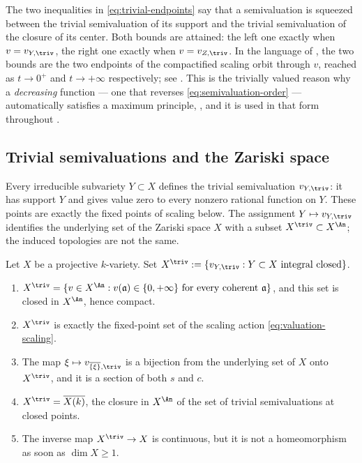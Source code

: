 \begin{remark}
\label{rem:ch32-endpoints-reading}
The two inequalities in \eqref{eq:trivial-endpoints} say that a
semivaluation is squeezed between the trivial semivaluation of its support
and the trivial semivaluation of the closure of its center.  Both bounds are
attained: the left one exactly when $v=v_{Y,\triv}$, the right one exactly
when $v=v_{Z,\triv}$.  In the language of
, the two bounds are the two endpoints of the
compactified scaling orbit through $v$, reached as $t\to0^+$ and
$t\to+\infty$ respectively; see .  This is
the trivially valued reason why a \emph{decreasing} function --- one that
reverses \eqref{eq:semivaluation-order} --- automatically satisfies a
maximum principle, , and it is used in that
form throughout .
\end{remark}

\subsection{Trivial semivaluations and the Zariski space}
\label{sec:ch32-trivial-locus}

Every irreducible subvariety $Y\subset X$ defines the trivial
semivaluation $v_{Y,\triv}$: it has support $Y$ and gives value zero to
every nonzero rational function on $Y$.  These points are exactly the fixed
points of scaling below.  The assignment $Y\mapsto v_{Y,\triv}$ identifies
the underlying set of the Zariski space $X$ with a subset
$X^{\triv}\subset X^{\An}$; the induced topologies are not the same.

\begin{theorem}
\label{thm:ch32-trivial-locus}
Let $X$ be a projective $k$-variety.  Set
$X^{\triv}:=\{v_{Y,\triv}:Y\subset X\text{ integral closed}\}$.
\begin{enumerate}
\item\label{itm:ch32-tl:char}
$X^{\triv}=\{v\in X^{\An}:v(\mathfrak a)\in\{0,+\infty\}\text{ for every
coherent }\mathfrak a\}$, and this set is closed in $X^{\An}$, hence
compact.
\item\label{itm:ch32-tl:fixed}
$X^{\triv}$ is exactly the fixed-point set of the scaling action
\eqref{eq:valuation-scaling}.
\item\label{itm:ch32-tl:bijection}
The map $\xi\mapsto v_{\overline{\{\xi\}},\triv}$ is a bijection from the
underlying set of $X$ onto $X^{\triv}$, and it is a section of both
$s$ and $c$.
\item\label{itm:ch32-tl:closure}
$X^{\triv}=\overline{X(k)}$, the closure in $X^{\An}$ of the set of
trivial semivaluations at closed points.
\item\label{itm:ch32-tl:not-homeo}
The inverse map $X^{\triv}\to X$ is continuous, but it is not a
homeomorphism as soon as $\dim X\geq1$.
\end{enumerate}
\end{theorem}

